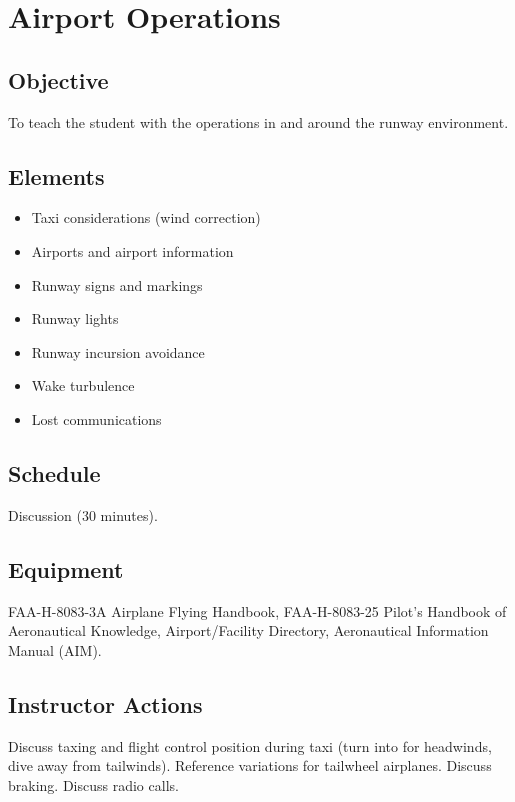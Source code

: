 
\section{Airport Operations}

\subsection{Objective}

To teach the student with the operations in and around the runway environment.

\subsection{Elements}

\begin{itemize}
  \item Taxi considerations (wind correction)
  \item Airports and airport information
  \item Runway signs and markings
  \item Runway lights
  \item Runway incursion avoidance
  \item Wake turbulence
  \item Lost communications
\end{itemize}

\subsection{Schedule}

Discussion (30 minutes).

\subsection{Equipment}

FAA-H-8083-3A Airplane Flying Handbook, FAA-H-8083-25 Pilot's Handbook of
Aeronautical Knowledge, Airport/Facility Directory, Aeronautical Information
Manual (AIM).

\subsection{Instructor Actions}

Discuss taxing and flight control position during taxi (turn into for
headwinds, dive away from tailwinds). Reference variations for tailwheel
airplanes. Discuss braking. Discuss radio calls.

